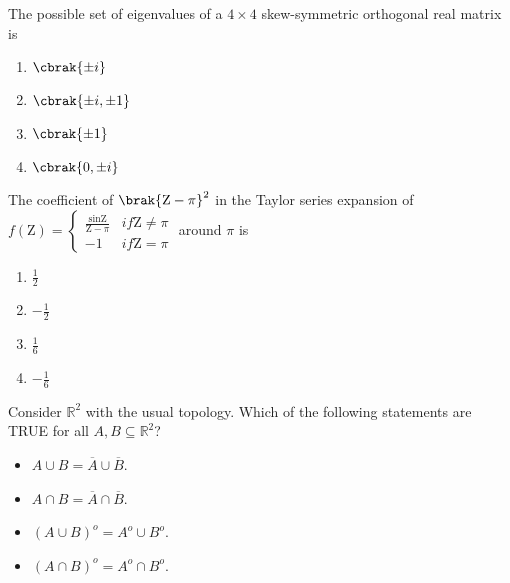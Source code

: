 \iffalse
    \title{Assignment}
    \author{AI24BTECH11024}
    \section{ae}
    \chapter{2011}
\fi
\item  The possible set of eigenvalues of a $ 4 \times 4 $ skew-symmetric orthogonal real matrix is
\begin{multicols}{4}
\begin{enumerate}
    \item $\cbrak{\pm i}$ 
    \item $\cbrak{\pm i,\pm 1}$
    \item $\cbrak{\pm 1}$
    \item $\cbrak{0,\pm i}$
\end{enumerate}
\end{multicols}
\item The coefficient of $ \brak{\text{Z} - \pi}^{2}$ in the Taylor series expansion of
$
f(\text{Z}) = \begin{cases} \frac{\sin \text{Z}}{\text{Z} - \pi} & if  \text{Z} \neq \pi \\ -1 & if  \text{Z} = \pi \end{cases}
$
around $\pi$ is
\begin{multicols}{4}
\begin{enumerate}
    \item $\frac{1}{2}$ 
    \item $ -\frac{1}{2} $
    \item $ \frac{1}{6}$ 
    \item $ -\frac{1}{6}$ 
\end{enumerate}
\end{multicols}
\item  Consider $ \mathbb{R}^{2} $ with the usual topology. Which of the following statements are TRUE for all $ A, B \subseteq \mathbb{R}^{2}$?
\begin{itemize}
    \item \( A \cup B = \overline{A} \cup \overline{B} \).
    \item \( A \cap B = \overline{A} \cap \overline{B} \).
    \item \( (A \cup B)^o = A^o \cup B^o \).
    \item \( (A \cap B)^o = A^o \cap B^o \).
\end{itemize}

